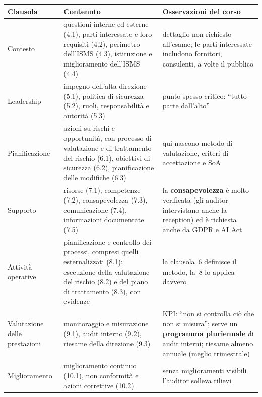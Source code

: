 \begin{center}
\small
\begin{tabularx}{\linewidth}{>{\raggedright\arraybackslash}p{2.8cm} X X}
\toprule
\textbf{Clausola} & \textbf{Contenuto} & \textbf{Osservazioni del corso}\\
\midrule
4 Contesto & questioni interne ed esterne (4.1), parti interessate e loro requisiti (4.2), perimetro
  dell'ISMS (4.3), istituzione e miglioramento dell'ISMS (4.4) & dettaglio non richiesto all'esame; le parti
  interessate includono fornitori, consulenti, a volte il pubblico\\
5 Leadership & impegno dell'alta direzione (5.1), politica di sicurezza (5.2), ruoli, responsabilità e
  autorità (5.3) & punto spesso critico: ``tutto parte dall'alto''\\
6 Pianificazione & azioni su rischi e opportunità, con processo di valutazione e di trattamento del rischio
  (6.1), obiettivi di sicurezza (6.2), pianificazione delle modifiche (6.3) & qui nascono metodo di
  valutazione, criteri di accettazione e SoA\\
7 Supporto & risorse (7.1), competenze (7.2), consapevolezza (7.3), comunicazione (7.4), informazioni
  documentate (7.5) & la \textbf{consapevolezza} è molto verificata (gli auditor intervistano anche la
  reception) ed è richiesta anche da GDPR e AI Act\\
8 Attività operative & pianificazione e controllo dei processi, compresi quelli esternalizzati (8.1);
  esecuzione della valutazione del rischio (8.2) e del piano di trattamento (8.3), con evidenze & la
  clausola~6 definisce il metodo, la~8 lo applica davvero\\
9 Valutazione delle prestazioni & monitoraggio e misurazione (9.1), audit interno (9.2), riesame della
  direzione (9.3) & KPI: ``non si controlla ciò che non si misura''; serve un \textbf{programma pluriennale}
  di audit interni; riesame almeno annuale (meglio trimestrale)\\
10 Miglioramento & miglioramento continuo (10.1), non conformità e azioni correttive (10.2) & senza
  miglioramenti visibili l'auditor solleva rilievi\\
\bottomrule
\end{tabularx}
\end{center}

